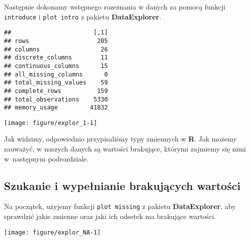 \documentclass[12pt, a4paper]{article}\usepackage[]{graphicx}\usepackage[]{xcolor}
\makeatletter
\def\maxwidth{ %
  \ifdim\Gin@nat@width>\linewidth
    \linewidth
  \else
    \Gin@nat@width
  \fi
}
\newenvironment{kframe}{%
 \def\at@end@of@kframe{}%
 \ifinner\ifhmode%
  \def\at@end@of@kframe{\end{minipage}}%
  \begin{minipage}{\columnwidth}%
 \fi\fi%
 \def\FrameCommand##1{\hskip\@totalleftmargin \hskip-\fboxsep
 \colorbox{shadecolor}{##1}\hskip-\fboxsep
     \hskip-\linewidth \hskip-\@totalleftmargin \hskip\columnwidth}%
 \MakeFramed {\advance\hsize-\width
   \@totalleftmargin\z@ \linewidth\hsize
   \@setminipage}}%
 {\par\unskip\endMakeFramed%
 \at@end@of@kframe}
\newenvironment{knitrout}{}{} %
\makeatother
\begin{document}
Następnie dokonamy wstępnego rozeznania w danych za pomocą funkcji \texttt{introduce} i \texttt{plot intro} z pakietu \textbf{DataExplorer}.

\begin{knitrout}
\color{fgcolor}\begin{kframe}
\begin{verbatim}
##                       [,1]
## rows                   205
## columns                 26
## discrete_columns        11
## continuous_columns      15
## all_missing_columns      0
## total_missing_values    59
## complete_rows          159
## total_observations    5330
## memory_usage         41832
\end{verbatim}
\end{kframe}

{\centering \texttt{[image: figure/explor\_1-1]} 

}


\end{knitrout}

Jak widzimy, odpowiednio przypisaliśmy typy zmiennych w \textbf{R}. Jak możemy zauważyć, w naszych danych są wartości brakujące, którymi zajmiemy się nimi w~następnym podrozdziale.

\subsection{Szukanie i wypełnianie brakujących wartości}

Na początek, użyjemy funkcji \texttt{plot missing} z pakietu \textbf{DataExplorer}, aby sprawdzić jakie zmienne oraz jaki ich odsetek ma brakujące wartości.

\begin{knitrout}
\color{fgcolor}

{\centering \texttt{[image: figure/explor\_NA-1]} 

}


\end{knitrout}
\end{document}
